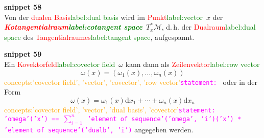 \documentclass[a4paper,twoside,english,ngerman,deutsch,german,sectrefs,envcountsame,envcountchap]{svmono}
\newcommand{\setref}[2]{\textcolor{red}{#1}\textcolor{green}{#2}}
\newcommand{\snippet}[1]{\textbf{snippet #1}\\}
\newcommand{\eqnote}[2]{\textcolor{orange}{#1}\textcolor{magenta}{\texttt{#2}}}
\begin{document}
\snippet{58}
Von der \setref{dualen Basis}{label:dual basis} wird im \setref{Punkt}{label:vector}~$x$ der \textbf{\em \setref{Kotangential\-raum}{label:cotangent space}}~$T_{x}^{*}\mathcal{M}$,
d.\,h. der \setref{Dualraum}{label:dual space} des \setref{Tangentialraumes}{label:tangent space}, aufgespannt.

\snippet{59}
Ein \setref{Kovektorfeld}{label:covector field}~$\omega$
kann dann als \setref{Zeilenvektor}{label:row vector}
\[
\omega(x)=\left(\omega_{1}(x),\ldots,\omega_{n}(x)\right)
\]\eqnote{concepts:'covector field', 'vector', 'covector', 'row vector'}{statement: }
oder in der Form
\begin{equation}
\omega(x)=\omega_{1}(x){\mathrm{d}} x_{1}+\cdots+\omega_{n}(x){\mathrm{d}} x_{n}\label{eq:Basisdarstellung-Kovektorfelder}
\end{equation}\eqnote{concepts:'covector field', 'vector', 'dual basis', 'covector'}{statement: 'omega'('x') == $\sum_{i=1}^n$ 'element of sequence'('omega', 'i')('x') * 'element of sequence'('dualb', 'i')}
angegeben werden.
\end{document}
